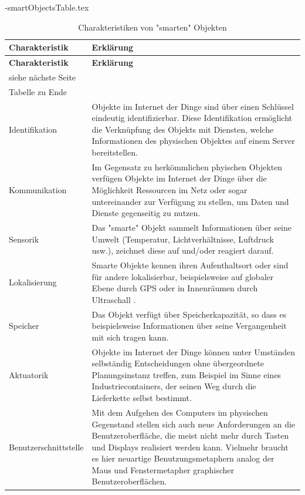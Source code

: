 \documentclass[a4paper, 12pt, twoside, headsepline=true]{scrartcl} %
\begin{document}
\begin{filecontents}{\jobname-smartObjectsTable.tex}
	\begin{longtable}{p{4.5cm}X}
		\caption{Charakteristiken von "smarten" Objekten\cite{iotwiki}}\\
		\label{table:smartObjectsCharacteristics}
		\textbf{Charakteristik} & \textbf{Erklärung}   \\
		\hline
		\endfirsthead %
		\textbf{Charakteristik} & \textbf{Erklärung}  \\
		\hline
		\endhead %
		siehe n{\"a}chste Seite\\
		\endfoot
		\hline
		Tabelle zu Ende \\
		\endlastfoot
		Identifikation & Objekte im Internet der Dinge sind über einen Schlüssel eindeutig identifizierbar. Diese Identifikation ermöglicht die Verknüpfung des Objekts mit Diensten, welche Informationen des physischen Objektes auf einem Server bereitstellen. 
		\\ \hline
		Kommunikation & Im Gegensatz zu herkömmlichen phyischen Objekten verfügen Objekte im Internet der Dinge über die Möglichkeit Ressourcen im Netz oder sogar untereinander zur Verfügung zu stellen, um Daten und Dienste gegenseitig zu nutzen.
		\\ \hline
		Sensorik & Das "smarte" Objekt sammelt Informationen über seine Umwelt (Temperatur, Lichtverhältnisse, Luftdruck usw.), zeichnet diese auf und/oder reagiert darauf.
		\\ \hline
		Lokalisierung & Smarte Objekte kennen ihren Aufenthaltsort oder sind für andere lokalisierbar, beispielsweise auf globaler Ebene durch GPS oder in Innenräumen durch Ultraschall .
		\\ \hline
		Speicher & Das Objekt verfügt über Speicherkapazität, so dass es beispielsweise Informationen über seine Vergangenheit mit sich tragen kann.
		\\ \hline
		Aktuatorik & Objekte im Internet der Dinge können unter Umständen selbständig Entscheidungen ohne übergeordnete Planungsinstanz treffen, zum Beispiel im Sinne eines Industriecontainers, der seinen Weg durch die Lieferkette selbst bestimmt.
		\\ \hline
		Benutzerschnittstelle & Mit dem Aufgehen des Computers im physischen Gegenstand stellen sich auch neue Anforderungen an die Benutzeroberfläche, die meist nicht mehr durch Tasten und Displays realisiert werden kann. Vielmehr braucht es hier neuartige Benutzungsmetaphern analog der Maus und Fenstermetapher graphischer Benutzeroberflächen.
		\\ \hline
	\end{longtable}
\end{filecontents}
\end{document}
